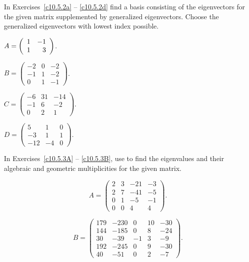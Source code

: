\noindent In Exercises~\ref{c10.5.2a} -- \ref{c10.5.2d} find a basis 
consisting of the eigenvectors for the given matrix supplemented by 
generalized eigenvectors.  Choose the generalized eigenvectors with 
lowest index possible.
\begin{exercise}  \label{c10.5.2a}
$A=\left(\begin{array}{rr} 1 & -1\\ 1 &3\end{array}\right)$.
\end{exercise}
\begin{exercise} \label{c10.5.2b}
$B=\left(\begin{array}{rrr} -2 & 0 & -2 \\-1 & 1 & -2 \\ 0 & 1 & -1 \end{array}
\right)$.
\end{exercise}
\begin{exercise} \label{c10.5.2c}
$C=\left(\begin{array}{rrr} -6 & 31 & -14 \\-1 & 6 & -2 \\ 0 & 2 & 1\end{array}
\right)$.
\end{exercise}
\begin{exercise} \label{c10.5.2d}
$D=\left(\begin{array}{rrr} 5 & 1 & 0 \\-3 & 1 & 1 \\ -12 & -4 & 0\end{array}
\right)$.
\end{exercise}


\CEXER
\noindent In Exercises~\ref{c10.5.3A} -- \ref{c10.5.3B}, use \Matlab to find 
the eigenvalues and their algebraic and geometric multiplicities for the given 
matrix.
\begin{exercise} \label{c10.5.3A}
\begin{equation*}
A=\left(\begin{array}{rrrr} 2 & 3 & -21 & -3 \\2 & 7 & -41 & -5 \\ 
0 & 1 & -5 & -1 \\ 0 & 0 & 4 & 4 \end{array}
\right).
\end{equation*}
\end{exercise}
\begin{exercise} \label{c10.5.3B}
\begin{equation*}
B=\left(\begin{array}{rrrrr} 179 & -230 & 0 & 10 & -30 \\
144 & -185 & 0 & 8 & -24 \\ 30 & -39 & -1 & 3 & -9 \\ 192 & -245 & 0 & 9 & -30 
\\ 40 & -51 & 0 & 2 & -7\end{array}\right).
\end{equation*}
\end{exercise}


